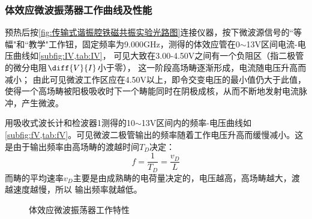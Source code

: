 \subsubsection{体效应微波振荡器工作曲线及性能} %
	\label{ssub:体效应微波振荡器工作曲线及性能}
	\par 预热后按\cref{fig:传输式谐振腔铁磁共振实验光路图}连接仪器，按下微波源信号的“等幅"和“教学"工作钮，固定频率为9.000GHz，测得的体效应管在0$\sim$13V区间电流-电压曲线如\cref{subfig:IV,tab:IV}，
	可见大致在3.00-4.50V之间有一个负阻区（指二极管的微分电阻$\diff{V}{I}$小于零），
	这一阶段高场畴逐渐形成，电流随电压升高而减小；
	由此可见微波工作区应在4.50V以上，即令交变电压的最小值仍大于此值，使得一个高场畴被阳极吸收时下一个畴能同时在阴极成核，从而不断地发射电流脉冲，产生微波。
	\par 用吸收式波长计和检波器1测得的10$\sim$13V区间内的频率-电压曲线如\cref{subfig:fV,tab:fV}。可见微波二极管输出的频率随着工作电压升高而缓慢减小。这是由于输出频率由高场畴的渡越时间$T_D$决定：
	\begin{equation}
		f=\dfrac{1}{T_D}=\dfrac{v_D}{L}
	\end{equation}
	而畴的平均速率$v_D$主要是由成熟畴的电荷量决定的，电压越高，高场畴越大，渡越速度越慢，所以
	输出频率就越低。
	\begin{figure}[htbp]
		\hfill
		\hfill
		\caption{体效应微波振荡器工作特性}
	\end{figure}

